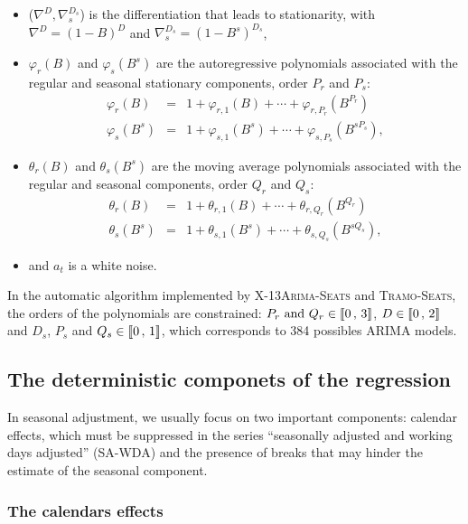 \documentclass[12pt, a4paper]{article}
\begin{document}
\begin{itemize}
	\item ($\nabla^D, \nabla_s^{D_s}$) is the differentiation that leads to stationarity, with $\nabla^D = (1-B)^D$ and $\nabla^{D_s}_s=(1-B^s)^{D_s}$,
	\item $\varphi_r (B)$  and $\varphi_s (B^s)$ are the autoregressive polynomials associated with the regular and seasonal stationary components, order $P_r$ and $P_s$: 
$$
\begin{array}{lcl}
\varphi_r (B)   & = & 1 + \varphi_{r,1} (B) + \cdots + \varphi_{r,P_r} (B^{P_r}) \\
\varphi_s (B^s) & = & 1 + \varphi_{s,1} (B^s) + \cdots + \varphi_{s,P_s} (B^{sP_s}),
\end{array}
$$
	\item $\theta_r (B)$  and $\theta_s (B^s)$ are the moving average polynomials associated with the regular and seasonal components, order $Q_r$ and $Q_s$: 
$$
\begin{array}{lcl}
\theta_r (B)   & = & 1 + \theta_{r,1} (B) + \cdots + \theta_{r,Q_r} (B^{Q_r}) \\
\theta_s (B^s) & = & 1 + \theta_{s,1} (B^s) + \cdots + \theta_{s,Q_s} (B^{sQ_s}),
\end{array}
$$
	\item and $a_t$ is a white noise.
\end{itemize}

In the automatic algorithm implemented by \textsc{X-13Arima-Seats} and \textsc{Tramo-Seats}, the orders of the polynomials are constrained: $P_r\text{ and }Q_r\in \llbracket 0\,,\, 3 \rrbracket$, $D\in \llbracket 0\,,\, 2 \rrbracket$ and $D_s$, $P_s$ and $Q_s\in \llbracket 0\,,\, 1 \rrbracket$, which corresponds to 384 possibles ARIMA models. 

\subsection{The deterministic componets of the regression}

In seasonal adjustment, we usually focus on two important components: calendar effects, which must be suppressed in the series ``seasonally adjusted and working days adjusted'' (SA-WDA) and the presence of breaks that may hinder the estimate of the seasonal component.

\subsubsection{The calendars effects}
\end{document}
